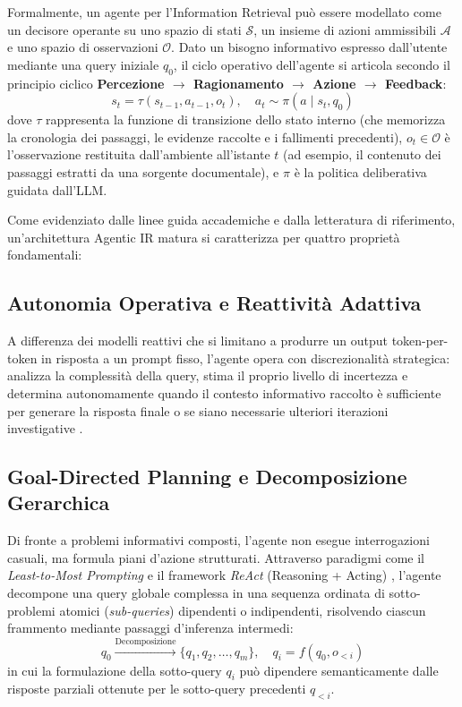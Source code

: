 Formalmente, un agente per l'Information Retrieval può essere modellato come un decisore operante su uno spazio di stati $\mathcal{S}$, un insieme di azioni ammissibili $\mathcal{A}$ e uno spazio di osservazioni $\mathcal{O}$. Dato un bisogno informativo espresso dall'utente mediante una query iniziale $q_0$, il ciclo operativo dell'agente si articola secondo il principio ciclico \textbf{Percezione $\rightarrow$ Ragionamento $\rightarrow$ Azione $\rightarrow$ Feedback}:
\begin{equation}
    s_t = \tau(s_{t-1}, a_{t-1}, o_t), \quad a_t \sim \pi(a \mid s_t, q_0)
\end{equation}
dove $\tau$ rappresenta la funzione di transizione dello stato interno (che memorizza la cronologia dei passaggi, le evidenze raccolte e i fallimenti precedenti), $o_t \in \mathcal{O}$ è l'osservazione restituita dall'ambiente all'istante $t$ (ad esempio, il contenuto dei passaggi estratti da una sorgente documentale), e $\pi$ è la politica deliberativa guidata dall'LLM.

Come evidenziato dalle linee guida accademiche e dalla letteratura di riferimento, un'architettura Agentic IR matura si caratterizza per quattro proprietà fondamentali:

\subsection{Autonomia Operativa e Reattività Adattiva}
A differenza dei modelli reattivi che si limitano a produrre un output token-per-token in risposta a un prompt fisso, l'agente opera con discrezionalità strategica: analizza la complessità della query, stima il proprio livello di incertezza e determina autonomamente quando il contesto informativo raccolto è sufficiente per generare la risposta finale o se siano necessarie ulteriori iterazioni investigative \cite{jeong2024adaptiverag}.

\subsection{Goal-Directed Planning e Decomposizione Gerarchica}
Di fronte a problemi informativi composti, l'agente non esegue interrogazioni casuali, ma formula piani d'azione strutturati. Attraverso paradigmi come il \textit{Least-to-Most Prompting} \cite{zhou2022leasttomost} e il framework \textit{ReAct} (Reasoning + Acting) \cite{yao2022react}, l'agente decompone una query globale complessa in una sequenza ordinata di sotto-problemi atomici (\textit{sub-queries}) dipendenti o indipendenti, risolvendo ciascun frammento mediante passaggi d'inferenza intermedi:
\begin{equation}
    q_0 \xrightarrow{\text{Decomposizione}} \{q_1, q_2, \dots, q_m\}, \quad q_i = f(q_0, o_{<i})
\end{equation}
in cui la formulazione della sotto-query $q_i$ può dipendere semanticamente dalle risposte parziali ottenute per le sotto-query precedenti $q_{<i}$.

